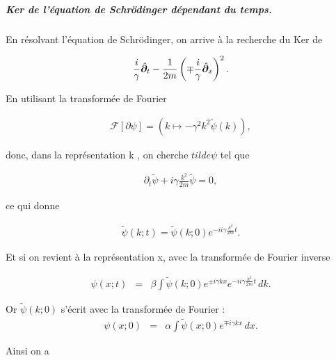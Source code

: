 \subparagraph{Ker de l'équation de Schrödinger dépendant du temps.}

En résolvant l'équation de  Schrödinger, on arrive à la recherche du $\mathrm{Ker}$ de 

\begin{eqnarray}
    \frac{i}\gamma \hat{\bm{\partial}}_t - \frac{1}{2m} \left ( \mp \frac{i}\gamma \hat{\bm{\partial}}_x \right )^2.
\end{eqnarray}

En utilisant la transformée de Fourier 

\begin{eqnarray}
    \mathcal F[\partial \psi ] = ( k \mapsto - \gamma^2 k^2 \tilde \psi (k)),
\end{eqnarray}

donc, dans  la représentation \guillemotleft{}k\guillemotright{} ,  on cherche $ tilde \psi$ tel que 

\begin{eqnarray}
    \partial_t \tilde \psi + i\gamma\frac{k^2}{2m}  \tilde \psi = 0 ,
\end{eqnarray}

ce qui donne 

\begin{eqnarray}
    \tilde \psi (k ; t ) = \tilde \psi (k ; 0 ) e^{-i i\gamma\frac{k^2}{2m} t} .
\end{eqnarray}

Et si on revient à la représentation \guillemotleft{}x\guillemotright{}, avec la transformée de Fourier inverse 

\begin{eqnarray}
    \psi (x ; t ) & = & \beta \int \tilde \psi (k ; 0 ) e^{\pm i \gamma kx } e^{-i i\gamma\frac{k^2}{2m} t} \, dk  .
\end{eqnarray}

Or $\tilde \psi (k ; 0  )$ s'écrit  avec la transformée de Fourier :
\begin{eqnarray}
    \psi (x ; 0 ) & =  &\alpha \int \tilde \psi (x ; 0 ) e^{\mp i \gamma kx } \, dx  .
\end{eqnarray}

Ainsi on a 

